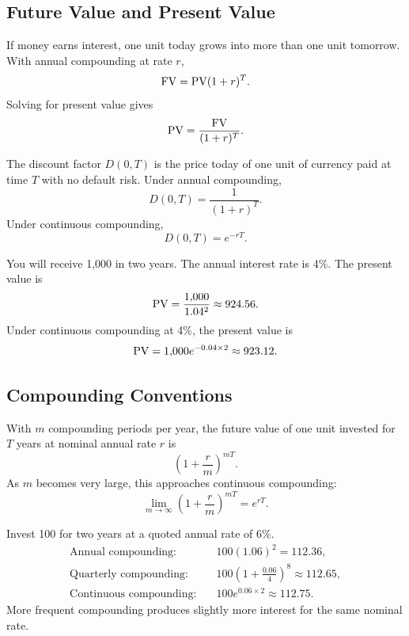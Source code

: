 \subsection{Future Value and Present Value}

If money earns interest, one unit today grows into more than one unit tomorrow.
With annual compounding at rate $r$,
\[
    \mathrm{FV} = \mathrm{PV}(1+r)^T.
\]
Solving for present value gives
\[
    \mathrm{PV} = \frac{\mathrm{FV}}{(1+r)^T}.
\]

\begin{defN}
The discount factor $D(0,T)$ is the price today of one unit of currency paid at
time $T$ with no default risk. Under annual compounding,
\[
    D(0,T)=\frac{1}{(1+r)^T}.
\]
Under continuous compounding,
\[
    D(0,T)=e^{-rT}.
\]
\end{defN}

\begin{exmp}
You will receive 1,000 in two years. The annual interest rate is 4\%. The present
value is
\[
    \mathrm{PV}=\frac{1{,}000}{1.04^2}\approx 924.56.
\]
Under continuous compounding at 4\%, the present value is
\[
    \mathrm{PV}=1{,}000e^{-0.04\times 2}\approx 923.12.
\]
\end{exmp}

\subsection{Compounding Conventions}

With $m$ compounding periods per year, the future value of one unit invested for
$T$ years at nominal annual rate $r$ is
\[
    \left(1+\frac{r}{m}\right)^{mT}.
\]
As $m$ becomes very large, this approaches continuous compounding:
\[
    \lim_{m\to\infty}\left(1+\frac{r}{m}\right)^{mT}=e^{rT}.
\]

\begin{exmp}
Invest 100 for two years at a quoted annual rate of 6\%.
\[
\begin{aligned}
    \text{Annual compounding:} \quad
    &100(1.06)^2 = 112.36,\\
    \text{Quarterly compounding:} \quad
    &100\left(1+\frac{0.06}{4}\right)^8 \approx 112.65,\\
    \text{Continuous compounding:} \quad
    &100e^{0.06\times 2}\approx 112.75.
\end{aligned}
\]
More frequent compounding produces slightly more interest for the same nominal
rate.
\end{exmp}

